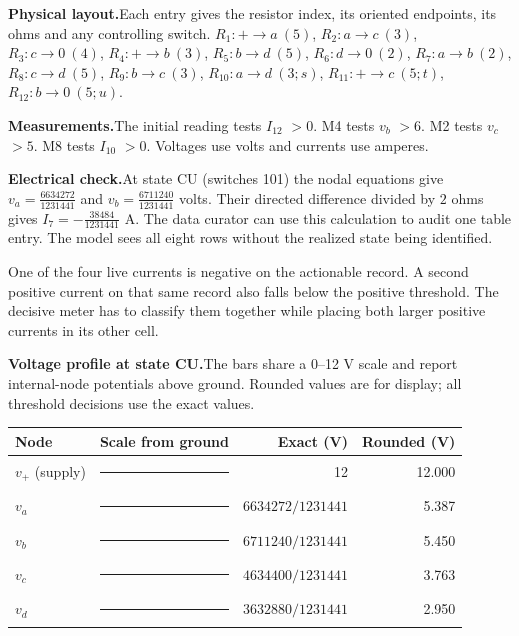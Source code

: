 \documentclass[12pt,letterpaper]{article}
\newcommand{\reading}[2]{\par\smallskip\textsf{\color{accent}\bfseries #1}\enspace #2\par}
\begin{document}
\reading{Physical layout.}{Each entry gives the resistor index, its oriented endpoints, its ohms and any controlling switch. $R_{1}\colon +\to a\ (5)$, $R_{2}\colon a\to c\ (3)$, $R_{3}\colon c\to 0\ (4)$, $R_{4}\colon +\to b\ (3)$, $R_{5}\colon b\to d\ (5)$, $R_{6}\colon d\to 0\ (2)$, $R_{7}\colon a\to b\ (2)$, $R_{8}\colon c\to d\ (5)$, $R_{9}\colon b\to c\ (3)$, $R_{10}\colon a\to d\ (3;s)$, $R_{11}\colon +\to c\ (5;t)$, $R_{12}\colon b\to 0\ (5;u)$.}

\reading{Measurements.}{The initial reading tests $I_{12}$ $>0$. M4 tests $v_{b}$ $>6$. M2 tests $v_{c}$ $>5$. M8 tests $I_{10}$ $>0$. Voltages use volts and currents use amperes.}

\reading{Electrical check.}{At state CU (switches 101) the nodal equations give $v_{a}=\tfrac{6634272}{1231441}$ and $v_{b}=\tfrac{6711240}{1231441}$ volts. Their directed difference divided by $2$ ohms gives $I_{7}=-\tfrac{38484}{1231441}$ A. The data curator can use this calculation to audit one table entry. The model sees all eight rows without the realized state being identified.}

One of the four live currents is negative on the actionable record. A second positive current on that same record also falls below the positive threshold. The decisive meter has to classify them together while placing both larger positive currents in its other cell.
\reading{Voltage profile at state CU.}{The bars share a 0--12 V scale and report internal-node potentials above ground. Rounded values are for display; all threshold decisions use the exact values.}

\begin{center}{\footnotesize\setlength{\tabcolsep}{4pt}\begin{tabularx}{\linewidth}{@{}lYrr@{}}\toprule
Node & Scale from ground & Exact (V) & Rounded (V)\\ \midrule
$v_{+}$ (supply) & {\color{mute}\rule{132pt}{1.4pt}} & 12 & 12.000\\
$v_{a}$ & {\color{accent}\rule{59.261pt}{3.4pt}} & $6634272/1231441$ & 5.387\\
$v_{b}$ & {\color{accent}\rule{59.949pt}{3.4pt}} & $6711240/1231441$ & 5.450\\
$v_{c}$ & {\color{accent}\rule{41.397pt}{3.4pt}} & $4634400/1231441$ & 3.763\\
$v_{d}$ & {\color{accent}\rule{32.451pt}{3.4pt}} & $3632880/1231441$ & 2.950\\ \bottomrule\end{tabularx}}
\end{center}
\end{document}

